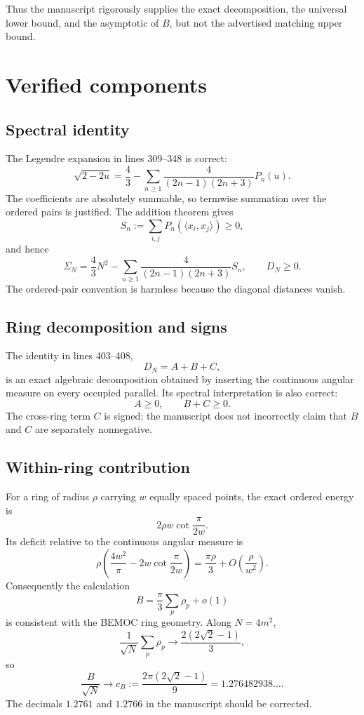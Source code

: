 \documentclass[11pt]{article}
\begin{document}
Thus the manuscript rigorously supplies the exact decomposition, the
universal lower bound, and the asymptotic of $B$, but not the advertised
matching upper bound.

\section{Verified components}

\subsection{Spectral identity}

The Legendre expansion in lines 309--348 is correct:
\[
 \sqrt{2-2u}
 =\frac43-\sum_{n\ge1}\frac4{(2n-1)(2n+3)}P_n(u).
\]
The coefficients are absolutely summable, so termwise summation over the
ordered pairs is justified.  The addition theorem gives
\[
 S_n:=\sum_{i,j}P_n(\langle x_i,x_j\rangle)\ge0,
\]
and hence
\[
 \Sigma_N=\frac43N^2-\sum_{n\ge1}\frac4{(2n-1)(2n+3)}S_n,
 \qquad D_N\ge0.
\]
The ordered-pair convention is harmless because the diagonal distances
vanish.

\subsection{Ring decomposition and signs}

The identity in lines 403--408,
\[
 D_N=A+B+C,
\]
is an exact algebraic decomposition obtained by inserting the continuous
angular measure on every occupied parallel.  Its spectral interpretation is
also correct:
\[
 A\ge0,\qquad B+C\ge0.
\]
The cross-ring term $C$ is signed; the manuscript does not incorrectly claim
that $B$ and $C$ are separately nonnegative.

\subsection{Within-ring contribution}

For a ring of radius $\rho$ carrying $w$ equally spaced points, the exact
ordered energy is
\[
 2\rho w\cot\frac{\pi}{2w}.
\]
Its deficit relative to the continuous angular measure is
\[
 \rho\left(\frac{4w^2}{\pi}-2w\cot\frac{\pi}{2w}\right)
 =\frac{\pi\rho}{3}+O\left(\frac{\rho}{w^2}\right).
\]
Consequently the calculation
\[
 B=\frac{\pi}{3}\sum_p\rho_p+o(1)
\]
is consistent with the BEMOC ring geometry.  Along $N=4m^2$,
\[
 \frac1{\sqrt N}\sum_p\rho_p\longrightarrow
 \frac{2(2\sqrt2-1)}3,
\]
so
\[
 \frac{B}{\sqrt N}\longrightarrow
 c_B:=\frac{2\pi(2\sqrt2-1)}9
 =1.276482938\ldots.
\]
The decimals $1.2761$ and $1.2766$ in the manuscript should be corrected.
\end{document}
